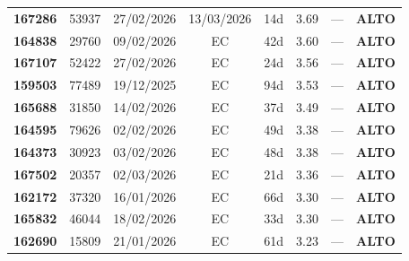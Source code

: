 \documentclass[a4paper,10pt]{article}
\begin{document}
\begin{center}
\begin{longtable}{>{\scriptsize}r>{\scriptsize}r>{\scriptsize}c>{\scriptsize}c>{\scriptsize}r>{\scriptsize}r>{\scriptsize}r>{\scriptsize}l}
\textcolor{anomorange}{\textbf{167286}} & 53937 & 27/02/2026 & 13/03/2026 & 14d & \textcolor{anomorange}{3.69} & --- & \textcolor{anomorange}{\textbf{ALTO}} \\

\textcolor{anomorange}{\textbf{164838}} & 29760 & 09/02/2026 & \textcolor{anomorange}{EC} & 42d & \textcolor{anomorange}{3.60} & --- & \textcolor{anomorange}{\textbf{ALTO}} \\

\textcolor{anomorange}{\textbf{167107}} & 52422 & 27/02/2026 & \textcolor{anomorange}{EC} & 24d & \textcolor{anomorange}{3.56} & --- & \textcolor{anomorange}{\textbf{ALTO}} \\

\textcolor{anomorange}{\textbf{159503}} & 77489 & 19/12/2025 & \textcolor{anomorange}{EC} & 94d & \textcolor{anomorange}{3.53} & --- & \textcolor{anomorange}{\textbf{ALTO}} \\

\textcolor{anomorange}{\textbf{165688}} & 31850 & 14/02/2026 & \textcolor{anomorange}{EC} & 37d & \textcolor{anomorange}{3.49} & --- & \textcolor{anomorange}{\textbf{ALTO}} \\

\textcolor{anomorange}{\textbf{164595}} & 79626 & 02/02/2026 & \textcolor{anomorange}{EC} & 49d & \textcolor{anomorange}{3.38} & --- & \textcolor{anomorange}{\textbf{ALTO}} \\

\textcolor{anomorange}{\textbf{164373}} & 30923 & 03/02/2026 & \textcolor{anomorange}{EC} & 48d & \textcolor{anomorange}{3.38} & --- & \textcolor{anomorange}{\textbf{ALTO}} \\

\textcolor{anomorange}{\textbf{167502}} & 20357 & 02/03/2026 & \textcolor{anomorange}{EC} & 21d & \textcolor{anomorange}{3.36} & --- & \textcolor{anomorange}{\textbf{ALTO}} \\

\textcolor{anomorange}{\textbf{162172}} & 37320 & 16/01/2026 & \textcolor{anomorange}{EC} & 66d & \textcolor{anomorange}{3.30} & --- & \textcolor{anomorange}{\textbf{ALTO}} \\

\textcolor{anomorange}{\textbf{165832}} & 46044 & 18/02/2026 & \textcolor{anomorange}{EC} & 33d & \textcolor{anomorange}{3.30} & --- & \textcolor{anomorange}{\textbf{ALTO}} \\

\textcolor{anomorange}{\textbf{162690}} & 15809 & 21/01/2026 & \textcolor{anomorange}{EC} & 61d & \textcolor{anomorange}{3.23} & --- & \textcolor{anomorange}{\textbf{ALTO}} \\


\end{longtable}
\end{center}
\end{document}
